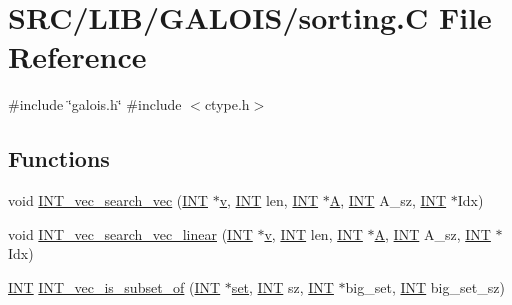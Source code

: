\hypertarget{sorting_8_c}{}\section{S\+R\+C/\+L\+I\+B/\+G\+A\+L\+O\+I\+S/sorting.C File Reference}
\label{sorting_8_c}
{\ttfamily \#include \char`\"{}galois.\+h\char`\"{}}\newline
{\ttfamily \#include $<$ctype.\+h$>$}\newline
\subsection*{Functions}
\begin{DoxyCompactItemize}
\item 
void \mbox{\hyperlink{sorting_8_c_a5359bd2dbac8e1ab54a374c6ed85f69b}{I\+N\+T\+\_\+vec\+\_\+search\+\_\+vec}} (\mbox{\hyperlink{galois_8h_a09fddde158a3a20bd2dcadb609de11dc}{I\+NT}} $\ast$\mbox{\hyperlink{simeon_8_c_aeb3f3030944801b163bc3b829a7f6710}{v}}, \mbox{\hyperlink{galois_8h_a09fddde158a3a20bd2dcadb609de11dc}{I\+NT}} len, \mbox{\hyperlink{galois_8h_a09fddde158a3a20bd2dcadb609de11dc}{I\+NT}} $\ast$\mbox{\hyperlink{simeon_8_c_a97833f04c3a9c008df5521a2fc291bb4}{A}}, \mbox{\hyperlink{galois_8h_a09fddde158a3a20bd2dcadb609de11dc}{I\+NT}} A\+\_\+sz, \mbox{\hyperlink{galois_8h_a09fddde158a3a20bd2dcadb609de11dc}{I\+NT}} $\ast$Idx)
\item 
void \mbox{\hyperlink{sorting_8_c_a3a52bbb40fb612b47834733329d552df}{I\+N\+T\+\_\+vec\+\_\+search\+\_\+vec\+\_\+linear}} (\mbox{\hyperlink{galois_8h_a09fddde158a3a20bd2dcadb609de11dc}{I\+NT}} $\ast$\mbox{\hyperlink{simeon_8_c_aeb3f3030944801b163bc3b829a7f6710}{v}}, \mbox{\hyperlink{galois_8h_a09fddde158a3a20bd2dcadb609de11dc}{I\+NT}} len, \mbox{\hyperlink{galois_8h_a09fddde158a3a20bd2dcadb609de11dc}{I\+NT}} $\ast$\mbox{\hyperlink{simeon_8_c_a97833f04c3a9c008df5521a2fc291bb4}{A}}, \mbox{\hyperlink{galois_8h_a09fddde158a3a20bd2dcadb609de11dc}{I\+NT}} A\+\_\+sz, \mbox{\hyperlink{galois_8h_a09fddde158a3a20bd2dcadb609de11dc}{I\+NT}} $\ast$Idx)
\item 
\mbox{\hyperlink{galois_8h_a09fddde158a3a20bd2dcadb609de11dc}{I\+NT}} \mbox{\hyperlink{sorting_8_c_a20ec6b8d7632de228f6a41317ee56be3}{I\+N\+T\+\_\+vec\+\_\+is\+\_\+subset\+\_\+of}} (\mbox{\hyperlink{galois_8h_a09fddde158a3a20bd2dcadb609de11dc}{I\+NT}} $\ast$\mbox{\hyperlink{nauty_8h_a9690bea211101f22a5e154087590c3da}{set}}, \mbox{\hyperlink{galois_8h_a09fddde158a3a20bd2dcadb609de11dc}{I\+NT}} sz, \mbox{\hyperlink{galois_8h_a09fddde158a3a20bd2dcadb609de11dc}{I\+NT}} $\ast$big\+\_\+set, \mbox{\hyperlink{galois_8h_a09fddde158a3a20bd2dcadb609de11dc}{I\+NT}} big\+\_\+set\+\_\+sz)

\end{DoxyCompactItemize}

